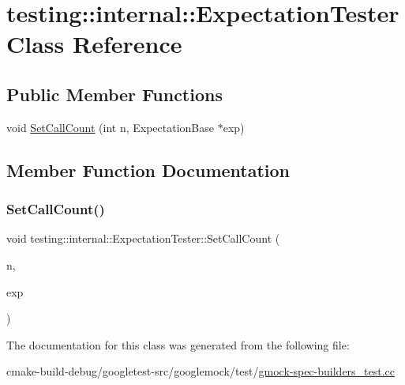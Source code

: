 \hypertarget{classtesting_1_1internal_1_1ExpectationTester}{}\section{testing\+::internal\+::Expectation\+Tester Class Reference}
\label{classtesting_1_1internal_1_1ExpectationTester}
\subsection*{Public Member Functions}
\begin{DoxyCompactItemize}
\item 
void \mbox{\hyperlink{classtesting_1_1internal_1_1ExpectationTester_af5d762355ef83f414c4b0fc14c8fc943}{Set\+Call\+Count}} (int n, Expectation\+Base $\ast$exp)
\end{DoxyCompactItemize}


\subsection{Member Function Documentation}
\mbox{\label{classtesting_1_1internal_1_1ExpectationTester_af5d762355ef83f414c4b0fc14c8fc943}} 
\subsubsection{\texorpdfstring{SetCallCount()}{SetCallCount()}}
{\footnotesize\ttfamily void testing\+::internal\+::\+Expectation\+Tester\+::\+Set\+Call\+Count (\begin{DoxyParamCaption}\item[{int}]{n,  }\item[{Expectation\+Base $\ast$}]{exp }\end{DoxyParamCaption})\hspace{0.3cm}{\ttfamily [inline]}}



The documentation for this class was generated from the following file\+:\begin{DoxyCompactItemize}
\item 
cmake-\/build-\/debug/googletest-\/src/googlemock/test/\mbox{\hyperlink{gmock-spec-builders__test_8cc}{gmock-\/spec-\/builders\+\_\+test.\+cc}}\end{DoxyCompactItemize}
